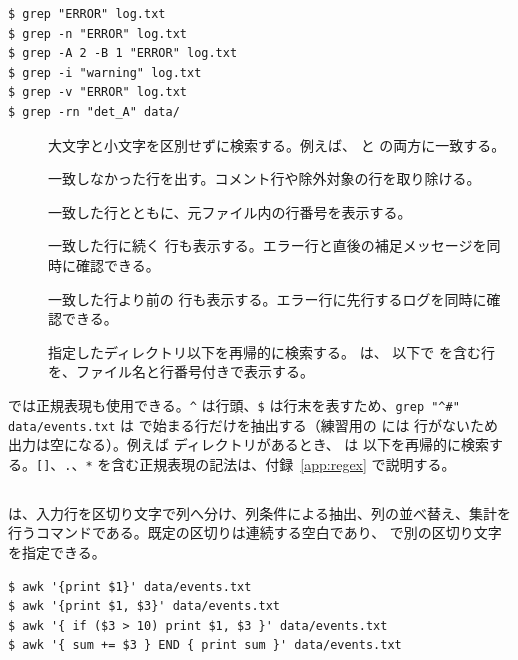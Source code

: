 \begin{lstlisting}[numbers=none, xleftmargin=2\zw]
$ grep "ERROR" log.txt
$ grep -n "ERROR" log.txt
$ grep -A 2 -B 1 "ERROR" log.txt
$ grep -i "warning" log.txt
$ grep -v "ERROR" log.txt
$ grep -rn "det_A" data/
\end{lstlisting}

\begin{description}
\item[] 大文字と小文字を区別せずに検索する。例えば、 と  の両方に一致する。
\item[] 一致しなかった行を出す。コメント行や除外対象の行を取り除ける。
\item[] 一致した行とともに、元ファイル内の行番号を表示する。
\item[] 一致した行に続く  行も表示する。エラー行と直後の補足メッセージを同時に確認できる。
\item[] 一致した行より前の  行も表示する。エラー行に先行するログを同時に確認できる。
\item[] 指定したディレクトリ以下を再帰的に検索する。 は、 以下で  を含む行を、ファイル名と行番号付きで表示する。
\end{description}

 では正規表現も使用できる。\verb|^| は行頭、\verb|$| は行末を表すため、\verb|grep "^#" data/events.txt| は \code{\#} で始まる行だけを抽出する（練習用の  には \code{\#} 行がないため出力は空になる）。例えば  ディレクトリがあるとき、 は  以下を再帰的に検索する。\verb|[]|、\verb|.|、\verb|*| を含む正規表現の記法は、付録~\ref{app:regex} で説明する。

\subsection{}

 は、入力行を区切り文字で列へ分け、列条件による抽出、列の並べ替え、集計を行うコマンドである。既定の区切りは連続する空白であり、 で別の区切り文字を指定できる。

\begin{lstlisting}[numbers=none, xleftmargin=2\zw]
$ awk '{print $1}' data/events.txt
$ awk '{print $1, $3}' data/events.txt
$ awk '{ if ($3 > 10) print $1, $3 }' data/events.txt
$ awk '{ sum += $3 } END { print sum }' data/events.txt
\end{lstlisting}

